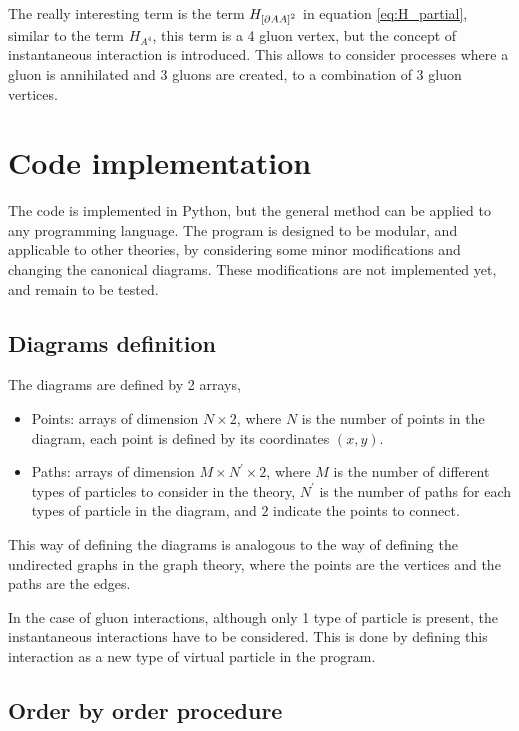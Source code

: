 \documentclass[11pt,a4paper,twoside,pdf]{article}
\numberwithin{equation}{section}
\begin{document}
The really interesting term is the term $H_{\left[ \partial A A \right]^2}$ in
equation \eqref{eq:H_partial}, similar to the term $H_{A^4}$, this term is a 4 gluon
vertex, but the concept of instantaneous interaction is introduced. This allows to 
consider processes where a gluon is annihilated and 3 gluons are created, to a 
combination of 3 gluon vertices.

\section{Code implementation} \label{sec:code}

The code is implemented in Python, but the general method can be applied to any 
programming language. The program is designed to be modular, and applicable to
other theories, by considering some minor modifications and changing the canonical
diagrams. These modifications are not implemented yet, and remain to be tested.

\subsection{Diagrams definition}

The diagrams are defined by 2 arrays, 
\begin{itemize}
    \item Points: arrays of dimension $N \times 2$, where $N$ is the number of 
    points in the diagram, each point is defined by its coordinates $(x,y)$.
    \item Paths: arrays of dimension $M \times N^\prime \times 2$, where $M$ is the
    number of different types of particles to consider in the theory, $N^\prime$ 
    is the number of paths for each types of particle in the diagram, and $2$ indicate
    the points to connect.
\end{itemize}

This way of defining the diagrams is analogous to the way of defining the undirected 
graphs in the graph theory, where the points are the vertices and the paths are the 
edges. 

In the case of gluon interactions, although only 1 type of particle is present, the
instantaneous interactions have to be considered. This is done by defining this 
interaction as a new type of virtual particle in the program.


\subsection{Order by order procedure}
\end{document}
